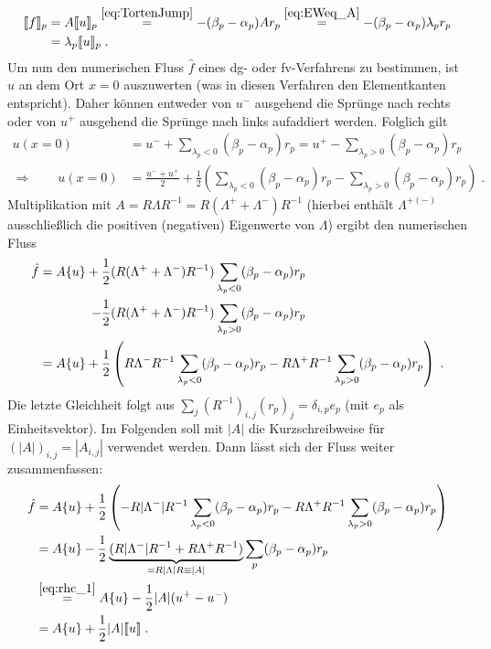 \begin{equation*}
  \begin{aligned}
    \llbracket f \rrbracket_p &= A\llbracket u \rrbracket_p \stackrel{\eqref{eq:TortenJump}}{=} -(\beta_p - \alpha_p) A r_p \stackrel{\eqref{eq:EWeq_A}}{=}  -(\beta_p - \alpha_p) \lambda_p r_p \\
    &= \lambda_p \llbracket u \rrbracket_p \; .
  \end{aligned}
\end{equation*}
Um nun den numerischen Fluss $\hat{f}$ eines \ac{dg}- oder \ac{fv}-Verfahrens zu bestimmen, ist $u$ an dem Ort $x=0$ auszuwerten (was in diesen Verfahren den Elementkanten entspricht). Daher können entweder von $u^-$ ausgehend die Sprünge nach rechts oder von $u^+$ ausgehend die Sprünge nach links aufaddiert  werden. Folglich gilt
\begin{align}
  \label{eq:rhc_1}
  u(x=0) &= u^- + \sum_{\lambda_p < 0} (\beta_p - \alpha_p)r_p = u^+ - \sum_{\lambda_p > 0} (\beta_p - \alpha_p)r_p \\
  \Rightarrow \qquad u(x=0) &= \frac{u^- + u^+}{2} + \frac{1}{2}\left( \sum_{\lambda_p < 0} (\beta_p - \alpha_p)r_p - \sum_{\lambda_p > 0} (\beta_p - \alpha_p)r_p \right) \; . \nonumber
\end{align}
Multiplikation mit $A=R\Lambda R^{-1} = R(\Lambda^+ + \Lambda^-)R^{-1}$ (hierbei enthält $\Lambda^{+(-)}$ ausschließlich die positiven (negativen) Eigenwerte von $\Lambda$) ergibt den numerischen Fluss
\begin{align*}
  \hat{f} = A \{ u \} + \frac{1}{2}& (R(\Lambda^+ + \Lambda^-)R^{-1}) \sum_{\lambda_p < 0} (\beta_p - \alpha_p)r_p \\
                     - \frac{1}{2}& (R(\Lambda^+ + \Lambda^-)R^{-1}) \sum_{\lambda_p > 0} (\beta_p - \alpha_p)r_p \\
         = A \{ u \} + \frac{1}{2}&\left( R\Lambda^-R^{-1} \sum_{\lambda_p < 0} (\beta_p - \alpha_p)r_p
                    - R\Lambda^+R^{-1} \sum_{\lambda_p > 0} (\beta_p - \alpha_p)r_p        \right) \; .
\end{align*}
Die letzte Gleichheit folgt aus $\sum_j (R^{-1})_{i,j} (r_p)_j = \delta_{i,p} e_p$ (mit $e_p$ als Einheitsvektor). Im Folgenden soll mit $|A|$ die Kurzschreibweise für $(|A|)_{i,j} = |A_{i,j}|$ verwendet werden. Dann lässt sich der Fluss weiter zusammenfassen:
\begin{align*}
  \hat{f} &= A \{ u \} + \frac{1}{2} \left( -R|\Lambda^-|R^{-1} \sum_{\lambda_p < 0} (\beta_p - \alpha_p)r_p
              - R\Lambda^+R^{-1} \sum_{\lambda_p > 0} (\beta_p - \alpha_p)r_p        \right) \\
        &= A \{ u \} - \frac{1}{2} \underbrace{(R|\Lambda^-|R^{-1} + R\Lambda^+R^{-1})}_{=R|\Lambda|R \equiv |A|}  \sum_p(\beta_p - \alpha_p)r_p   \\
        &\stackrel{\eqref{eq:rhc_1}}{=} A \{ u \} - \frac{1}{2} |A| (u^+-u^-) \\
        &= A \{ u \} + \frac{1}{2} |A| \llbracket u \rrbracket \; .
\end{align*}
